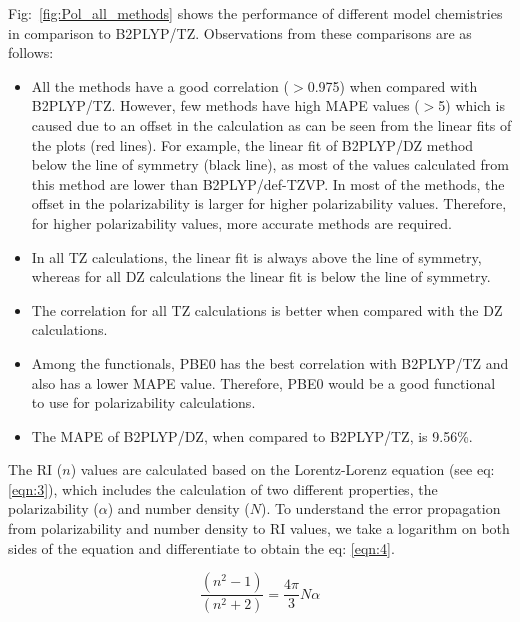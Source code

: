 
Fig:\ \ref{fig:Pol_all_methods} shows the performance of different model chemistries in comparison to B2PLYP/TZ. Observations from these comparisons are as follows:

\begin{itemize}
\item All the methods have a good correlation ($>$0.975) when compared with B2PLYP/TZ. However, few methods have high MAPE values ($>$5) which is caused due to an offset in the calculation as can be seen from the linear fits of the plots (red lines). For example, the linear fit of B2PLYP/DZ method below the line of symmetry (black line), as most of the values calculated from this method are lower than B2PLYP/def-TZVP. In most of the methods, the offset in the polarizability is larger for higher polarizability values. Therefore, for higher polarizability values, more accurate methods are required.
\item In all TZ calculations, the linear fit is always above the line of symmetry, whereas for all DZ calculations the linear fit is below the line of symmetry. 
\item The correlation for all TZ calculations is better when compared with the DZ calculations.
\item Among the functionals, PBE0 has the best correlation with B2PLYP/TZ and also has a lower MAPE value. Therefore, PBE0 would be a good functional to use for polarizability calculations.
\item The MAPE of B2PLYP/DZ, when compared to B2PLYP/TZ, is 9.56\%.
\end{itemize}

The RI ($n$) values are calculated based on the Lorentz-Lorenz equation (see eq: \ref{eqn:3}), which includes the calculation of two different properties, the polarizability ($\alpha$) and number density ($N$). To understand the error propagation from polarizability and number density to RI values, we take a logarithm on both sides of the equation and differentiate to obtain the eq: \ref{eqn:4}.  

\begin{equation} \label{eqn:3}
\frac{(n^{2}-1)}{(n^2+2)}=\frac{4\pi}{3}N\alpha
\end{equation}

